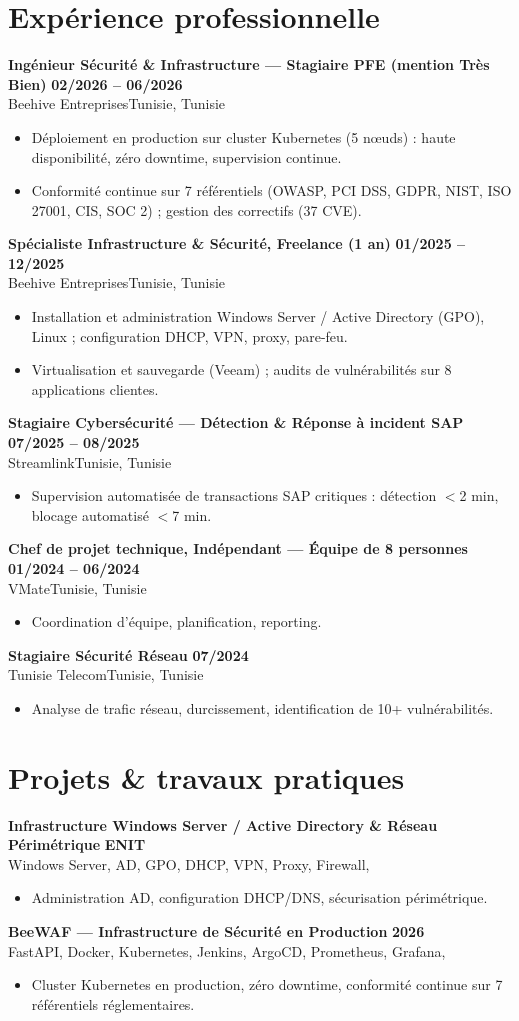 \documentclass[a4paper,9pt]{article}
\newcommand{\cventry}[4]{\textbf{#1} \hfill \textbf{#4}\\[0.2pt]#2{\ifx\relax#3\relax\else, #3\fi}\par\vspace{0.3pt}}
\begin{document}
\section{Expérience professionnelle}
\cventry{Ingénieur Sécurité \& Infrastructure --- Stagiaire PFE (mention Très Bien)}{Beehive Entreprises}{Tunisie}{02/2026 -- 06/2026}
\begin{itemize}
  \item Déploiement en production sur cluster Kubernetes (5 nœuds) : haute disponibilité, zéro downtime, supervision continue.
  \item Conformité continue sur 7 référentiels (OWASP, PCI DSS, GDPR, NIST, ISO 27001, CIS, SOC 2) ; gestion des correctifs (37 CVE).
\end{itemize}
\cventry{Spécialiste Infrastructure \& Sécurité, Freelance (1 an)}{Beehive Entreprises}{Tunisie}{01/2025 -- 12/2025}
\begin{itemize}
  \item Installation et administration Windows Server / Active Directory (GPO), Linux ; configuration DHCP, VPN, proxy, pare-feu.
  \item Virtualisation et sauvegarde (Veeam) ; audits de vulnérabilités sur 8 applications clientes.
\end{itemize}
\cventry{Stagiaire Cybersécurité --- Détection \& Réponse à incident SAP}{Streamlink}{Tunisie}{07/2025 -- 08/2025}
\begin{itemize}
  \item Supervision automatisée de transactions SAP critiques : détection $<$2 min, blocage automatisé $<$7 min.
\end{itemize}
\cventry{Chef de projet technique, Indépendant --- Équipe de 8 personnes}{VMate}{Tunisie}{01/2024 -- 06/2024}
\begin{itemize}
  \item Coordination d'équipe, planification, reporting.
\end{itemize}
\cventry{Stagiaire Sécurité Réseau}{Tunisie Telecom}{Tunisie}{07/2024}
\begin{itemize}
  \item Analyse de trafic réseau, durcissement, identification de 10+ vulnérabilités.
\end{itemize}
\section{Projets \& travaux pratiques}
\cventry{Infrastructure Windows Server / Active Directory \& Réseau Périmétrique}{Windows Server, AD, GPO, DHCP, VPN, Proxy, Firewall}{}{ENIT}
\begin{itemize}
  \item Administration AD, configuration DHCP/DNS, sécurisation périmétrique.
\end{itemize}
\cventry{BeeWAF --- Infrastructure de Sécurité en Production}{FastAPI, Docker, Kubernetes, Jenkins, ArgoCD, Prometheus, Grafana}{}{2026}
\begin{itemize}
  \item Cluster Kubernetes en production, zéro downtime, conformité continue sur 7 référentiels réglementaires.
\end{itemize}
\end{document}
